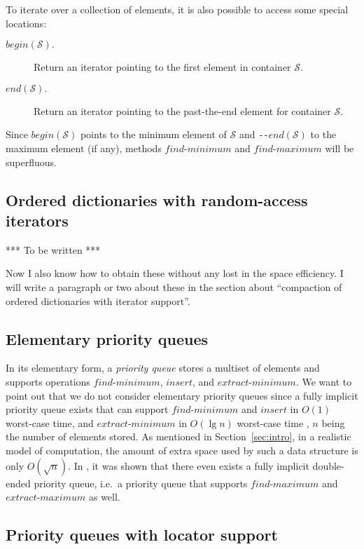 \documentclass{DIKU-article}
\newcommand{\Findmin}{\mbox{$\mathit{find}$\textnormal{-}}\allowbreak{}\mbox{$\mathit{minimum}$}}
\newcommand{\Findmax}{\mbox{$\mathit{find}$\textnormal{-}}\allowbreak{}\mbox{$\mathit{maximum}$}}
\newcommand{\Insert}{\mbox{$\mathit{insert}$}}
\newcommand{\Extractmin}{\mbox{$\mathit{extract}$\textnormal{-}$\mathit{minimum}$}}
\newcommand{\Extractmax}{\mbox{$\mathit{extract}$\textnormal{-}$\mathit{maximum}$}}
\newcommand{\Begin}{\mbox{$\mathit{begin}$}}
\newcommand{\End}{\mbox{$\mathit{end}$}}
\newcommand{\secref}[1]{\mbox{Section~\ref{sec:#1}}}
\begin{document}
To iterate over a collection of elements, it is also possible to
access some special locations:
\begin{description}
\item[\Begin{}$(\mathcal{S}).$] Return an iterator pointing to the first element
in container $\mathcal{S}$.

\item[\End{}$(\mathcal{S}).$] Return an iterator pointing to the past-the-end
element for container $\mathcal{S}$.
\end{description}
Since \Begin$(\mathcal{S})$ points to the minimum element of $\mathcal{S}$ and
\texttt{-}\texttt{-}\End$(\mathcal{S})$ to the maximum element (if any),
methods \Findmin{} and \Findmax{} will be superfluous.

\subsection*{Ordered dictionaries with random-access iterators}

*** To be written ***

Now I also know how to obtain these without any lost in the space
efficiency. I will write a paragraph or two about these in the section
about ``compaction of ordered dictionaries with iterator support''.

\subsection*{Elementary priority queues}

In its elementary form, a \emph{priority queue} stores a multiset of
elements and supports operations \Findmin{}, \Insert{}, and
\Extractmin{}.  We want to point out that we do not consider
elementary priority queues since a fully implicit priority queue
exists that can support \Findmin{} and \Insert{} in $O(1)$ worst-case
time, and \Extractmin{} in $O(\lg n)$ worst-case time \cite{CMP88},
$n$ being the number of elements stored. As mentioned in
\secref{intro}, in a realistic model of computation, the amount of
extra space used by such a data structure is only $O(\sqrt{n})$.  In
\cite{CMP88}, it was shown that there even exists a fully implicit
double-ended priority queue, i.e.~a priority queue that supports
\Findmax{} and \Extractmax{} as well.

\subsection*{Priority queues with locator support}
\end{document}
